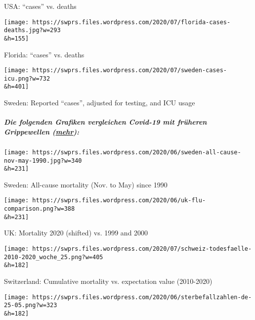 USA: ``cases'' vs. deaths

\href{https://swprs.files.wordpress.com/2020/07/florida-cases-deaths.jpg}{}

\texttt{[image: https://swprs.files.wordpress.com/2020/07/florida-cases-deaths.jpg?w=293\\\&h=155]}

Florida: ``cases'' vs. deaths

\href{https://swprs.files.wordpress.com/2020/07/sweden-cases-icu.png}{}

\texttt{[image: https://swprs.files.wordpress.com/2020/07/sweden-cases-icu.png?w=732\\\&h=401]}

Sweden: Reported ``cases'', adjusted for testing, and ICU usage

\hypertarget{die-folgenden-grafiken-vergleichen-covid-19-mit-fruxfcheren-grippewellen-mehr}{%
\subparagraph{\texorpdfstring{Die folgenden Grafiken vergleichen
Covid-19 mit früheren Grippewellen
(\href{https://swprs.org/studies-on-covid-19-lethality/\#overall-mortality}{mehr}):}{Die folgenden Grafiken vergleichen Covid-19 mit früheren Grippewellen (mehr):}}\label{die-folgenden-grafiken-vergleichen-covid-19-mit-fruxfcheren-grippewellen-mehr}}

\href{https://swprs.files.wordpress.com/2020/06/sweden-all-cause-nov-may-1990.jpg}{}

\texttt{[image: https://swprs.files.wordpress.com/2020/06/sweden-all-cause-nov-may-1990.jpg?w=340\\\&h=231]}

Sweden: All-cause mortality (Nov. to May) since 1990

\href{https://swprs.files.wordpress.com/2020/06/uk-flu-comparison.png}{}

\texttt{[image: https://swprs.files.wordpress.com/2020/06/uk-flu-comparison.png?w=388\\\&h=231]}

UK: Mortality 2020 (shifted) vs. 1999 and 2000

\href{https://swprs.files.wordpress.com/2020/07/schweiz-todesfaelle-2010-2020_woche_25.png}{}

\texttt{[image: https://swprs.files.wordpress.com/2020/07/schweiz-todesfaelle-2010-2020\_woche\_25.png?w=405\\\&h=182]}

Switzerland: Cumulative mortality vs. expectation value (2010-2020)

\href{https://swprs.files.wordpress.com/2020/06/sterbefallzahlen-de-25-05.png}{}

\texttt{[image: https://swprs.files.wordpress.com/2020/06/sterbefallzahlen-de-25-05.png?w=323\\\&h=182]}

